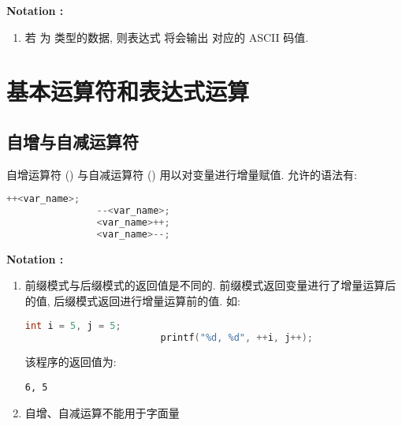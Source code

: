         \textbf{Notation :}
            \begin{enumerate}
                \item 若  为  类型的数据, 则表达式  将会输出  对应的 ASCII 码值.
            \end{enumerate}

\section{基本运算符和表达式运算}
    \subsection{自增与自减运算符}
        自增运算符 (\Code{++}) 与自减运算符 (\Code{--}) 用以对变量进行增量赋值. 允许的语法有:
            \begin{lstlisting}[language = {C}, gobble = 16]
                ++<var_name>;
                --<var_name>;
                <var_name>++;
                <var_name>--;
            \end{lstlisting}

        \textbf{Notation :}
            \begin{enumerate}
                \item 前缀模式与后缀模式的返回值是不同的. 前缀模式返回变量进行了增量运算后的值, 后缀模式返回进行增量运算前的值. 如:
                    \begin{lstlisting}[language = {C}, gobble = 24]
                        int i = 5, j = 5;
                        printf("%d, %d", ++i, j++);
                    \end{lstlisting}
                    该程序的返回值为:
                    \begin{lstlisting}[gobble = 24]
                        6, 5
                    \end{lstlisting}
                \item 自增、自减运算不能用于字面量
            \end{enumerate}

